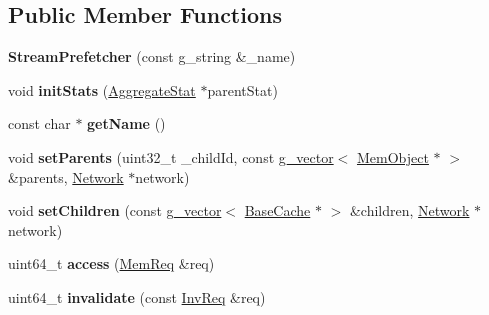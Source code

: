 \subsection*{Public Member Functions}
\begin{DoxyCompactItemize}
\item 
\hypertarget{classStreamPrefetcher_a970f74b76edd89ed0211ada9df24b119}{{\bfseries Stream\-Prefetcher} (const g\-\_\-string \&\-\_\-name)}\label{classStreamPrefetcher_a970f74b76edd89ed0211ada9df24b119}

\item 
\hypertarget{classStreamPrefetcher_ad0a16eed87db01ffcbc42a45824e65fb}{void {\bfseries init\-Stats} (\hyperlink{classAggregateStat}{Aggregate\-Stat} $\ast$parent\-Stat)}\label{classStreamPrefetcher_ad0a16eed87db01ffcbc42a45824e65fb}

\item 
\hypertarget{classStreamPrefetcher_a521ea99034db4504d9a19df50394a885}{const char $\ast$ {\bfseries get\-Name} ()}\label{classStreamPrefetcher_a521ea99034db4504d9a19df50394a885}

\item 
\hypertarget{classStreamPrefetcher_a662f4df26d0af098250b021c4fb69ebf}{void {\bfseries set\-Parents} (uint32\-\_\-t \-\_\-child\-Id, const \hyperlink{classg__vector}{g\-\_\-vector}$<$ \hyperlink{classMemObject}{Mem\-Object} $\ast$ $>$ \&parents, \hyperlink{classNetwork}{Network} $\ast$network)}\label{classStreamPrefetcher_a662f4df26d0af098250b021c4fb69ebf}

\item 
\hypertarget{classStreamPrefetcher_a4480f864cc0e916041f3aba6a2e38be9}{void {\bfseries set\-Children} (const \hyperlink{classg__vector}{g\-\_\-vector}$<$ \hyperlink{classBaseCache}{Base\-Cache} $\ast$ $>$ \&children, \hyperlink{classNetwork}{Network} $\ast$network)}\label{classStreamPrefetcher_a4480f864cc0e916041f3aba6a2e38be9}

\item 
\hypertarget{classStreamPrefetcher_a0e2d09fc748974655cdd3b23591d0f9b}{uint64\-\_\-t {\bfseries access} (\hyperlink{structMemReq}{Mem\-Req} \&req)}\label{classStreamPrefetcher_a0e2d09fc748974655cdd3b23591d0f9b}

\item 
\hypertarget{classStreamPrefetcher_a7c1cce2c7be8f10bec474b943765da71}{uint64\-\_\-t {\bfseries invalidate} (const \hyperlink{structInvReq}{Inv\-Req} \&req)}\label{classStreamPrefetcher_a7c1cce2c7be8f10bec474b943765da71}


\end{DoxyCompactItemize}
